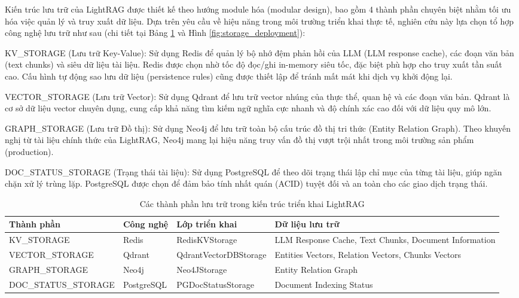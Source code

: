 \indent Kiến trúc lưu trữ của LightRAG được thiết kế theo hướng module hóa (modular design), bao gồm 4 thành phần chuyên biệt nhằm tối ưu hóa việc quản lý và truy xuất dữ liệu. Dựa trên yêu cầu về hiệu năng trong môi trường triển khai thực tế, nghiên cứu này lựa chọn tổ hợp công nghệ lưu trữ như sau (chi tiết tại Bảng \ref{tab:storage_mapping} và Hình \ref{fig:storage_deployment}):

\indent KV\_STORAGE (Lưu trữ Key-Value): Sử dụng Redis để quản lý bộ nhớ đệm phản hồi của LLM (LLM response cache), các đoạn văn bản (text chunks) và siêu dữ liệu tài liệu. Redis được chọn nhờ tốc độ đọc/ghi in-memory siêu tốc, đặc biệt phù hợp cho truy xuất tần suất cao. Cấu hình tự động sao lưu dữ liệu (persistence rules) cũng được thiết lập để tránh mất mát khi dịch vụ khởi động lại.

\indent VECTOR\_STORAGE (Lưu trữ Vector): Sử dụng Qdrant để lưu trữ vector nhúng của thực thể, quan hệ và các đoạn văn bản. Qdrant là cơ sở dữ liệu vector chuyên dụng, cung cấp khả năng tìm kiếm ngữ nghĩa cực nhanh và độ chính xác cao đối với dữ liệu quy mô lớn.

\indent GRAPH\_STORAGE (Lưu trữ Đồ thị): Sử dụng Neo4j để lưu trữ toàn bộ cấu trúc đồ thị tri thức (Entity Relation Graph). Theo khuyến nghị từ tài liệu chính thức của LightRAG, Neo4j mang lại hiệu năng truy vấn đồ thị vượt trội nhất trong môi trường sản phẩm (production).

\indent DOC\_STATUS\_STORAGE (Trạng thái tài liệu): Sử dụng PostgreSQL để theo dõi trạng thái lập chỉ mục của từng tài liệu, giúp ngăn chặn xử lý trùng lặp. PostgreSQL được chọn để đảm bảo tính nhất quán (ACID) tuyệt đối và an toàn cho các giao dịch trạng thái.

\begin{table}[H]
	\centering
	\caption{Các thành phần lưu trữ trong kiến trúc triển khai LightRAG}
	\label{tab:storage_mapping}
	\renewcommand{\arraystretch}{1.4}
	\footnotesize
	\begin{tabular}{|>{\raggedright\arraybackslash}p{4.6cm}|>{\raggedright\arraybackslash}p{2.2cm}|>{\raggedright\arraybackslash}p{3.7cm}|>{\raggedright\arraybackslash}p{3.7cm}|}
		\hline
		Thành phần & Công nghệ & Lớp triển khai & Dữ liệu lưu trữ \\ \hline
		KV\_STORAGE & Redis & RedisKVStorage & LLM Response Cache, Text Chunks, Document Information \\ \hline
		VECTOR\_STORAGE & Qdrant & QdrantVectorDBStorage & Entities Vectors, Relation Vectors, Chunks Vectors \\ \hline
		GRAPH\_STORAGE & Neo4j & Neo4JStorage & Entity Relation Graph \\ \hline
		DOC\_STATUS\_STORAGE & PostgreSQL & PGDocStatusStorage & Document Indexing Status \\ \hline
	\end{tabular}
\end{table}

